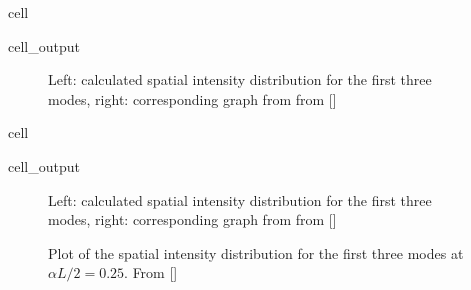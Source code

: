 \documentclass[a4paper,10pt,english,openany,oneside]{jupyterBook}
\begin{document}
\begin{sphinxuseclass}{cell}\begin{sphinxVerbatimOutput}

\begin{sphinxuseclass}{cell_output}
\begin{figure}[htbp]
\centering
\capstart

\noindent{}
\caption{Left: calculated spatial intensity distribution for the first three modes, right: corresponding graph from from {[}{]}}\label{\detokenize{Kogelnik-Shank_Coupled-Wave-Theory_DFB-Lasers:kogelnik11cc}}\end{figure}

\end{sphinxuseclass}\end{sphinxVerbatimOutput}

\end{sphinxuseclass}
\begin{sphinxuseclass}{cell}\begin{sphinxVerbatimOutput}

\begin{sphinxuseclass}{cell_output}
\begin{figure}[htbp]
\centering
\capstart

\noindent{}
\caption{Left: calculated spatial intensity distribution for the first three modes, right: corresponding graph from from {[}{]}}\label{\detokenize{Kogelnik-Shank_Coupled-Wave-Theory_DFB-Lasers:kogelnik11dc}}\end{figure}

\end{sphinxuseclass}\end{sphinxVerbatimOutput}

\end{sphinxuseclass}
\begin{figure}[htbp]
\centering
\capstart

\noindent{}
\caption{Plot of the spatial intensity distribution for the first three modes at \(\alpha L / 2 =0.25\). From {[}{]}}\label{\detokenize{Kogelnik-Shank_Coupled-Wave-Theory_DFB-Lasers:kogelnik12a}}\end{figure}
\end{document}
